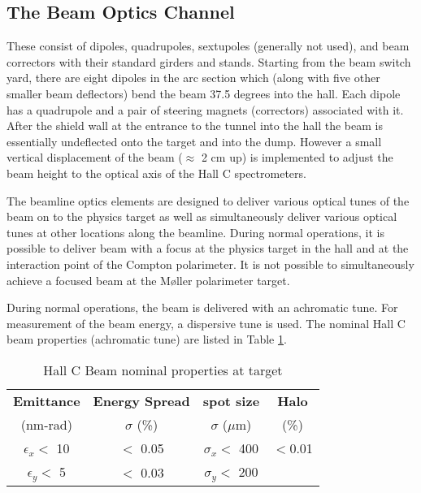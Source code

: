 
\subsection{The Beam Optics Channel}

These consist of dipoles, quadrupoles, sextupoles (generally not used), and 
beam correctors with their 
standard girders and stands. Starting from the beam switch yard, there are 
eight dipoles in the arc section which (along with five  other smaller beam 
deflectors) bend the beam 37.5 degrees into the hall. Each dipole has a 
quadrupole and a pair of steering magnets (correctors) associated with it. 
After the shield wall at the entrance to the tunnel into the hall the beam is 
essentially undeflected onto the target and into the dump. However a small vertical
displacement of the beam ($\approx$ 2 cm up) is implemented to
adjust the beam height to the optical axis of the Hall C spectrometers.

The beamline optics elements are designed to deliver 
various optical tunes of the beam on to the physics target as well as 
simultaneously deliver various optical tunes at other locations along the 
beamline. During normal operations, it is possible to deliver beam
with a focus at the physics target in the hall and at the interaction
point of the Compton polarimeter. It is not possible to simultaneously
achieve a focused beam at the M\o ller polarimeter target.

During normal operations, the beam is delivered with an achromatic tune.
For measurement of the beam energy, a dispersive tune is used. The nominal
Hall C beam properties (achromatic tune) are listed in Table \ref{beam_tab3}. 
 
\begin{table}[hp]
\begin{center}
\begin{tabular}{|c|c|c|c|} \hline
{\bf Emittance}  & {\bf Energy Spread} & {\bf spot size}  & {\bf Halo}  \\
   (nm-rad)       &   $\sigma$ (\%)     & $\sigma$ ($\mu$m)&  (\%) \\ \hline 
$\epsilon_x <$ 10 &  $<$ 0.05           & $\sigma_x<$ 400  &  $<$0.01 \\
$\epsilon_y <$ 5  &  $<$ 0.03           & $\sigma_y<$ 200  &        \\ \hline
\end{tabular}
\end{center}
\caption[Beamline: Hall C Beam nominal properties at target]{Hall C Beam nominal properties at target}
\label{beam_tab3}
\end{table}


